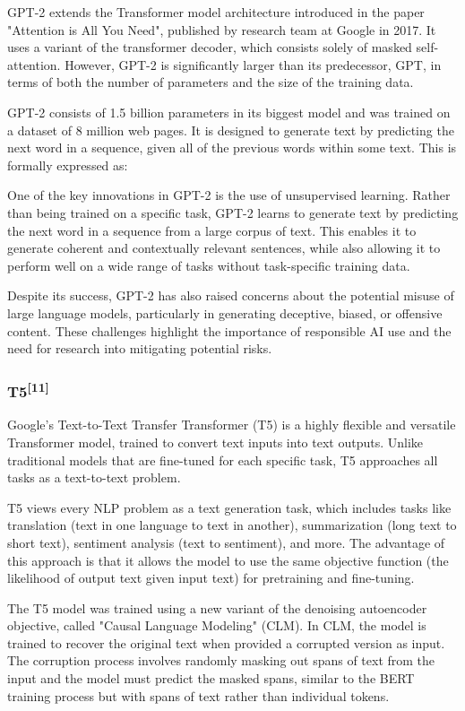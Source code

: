 \documentclass{article}
\begin{document}
GPT-2 extends the Transformer model architecture introduced in the paper "Attention is All You Need", published by research team at Google in 2017. It uses a variant of the transformer decoder, which consists solely of masked self-attention. However, GPT-2 is significantly larger than its predecessor, GPT, in terms of both the number of parameters and the size of the training data.

GPT-2 consists of 1.5 billion parameters in its biggest model and was trained on a dataset of 8 million web pages. It is designed to generate text by predicting the next word in a sequence, given all of the previous words within some text. This is formally expressed as:

One of the key innovations in GPT-2 is the use of unsupervised learning. Rather than being trained on a specific task, GPT-2 learns to generate text by predicting the next word in a sequence from a large corpus of text. This enables it to generate coherent and contextually relevant sentences, while also allowing it to perform well on a wide range of tasks without task-specific training data.

Despite its success, GPT-2 has also raised concerns about the potential misuse of large language models, particularly in generating deceptive, biased, or offensive content. These challenges highlight the importance of responsible AI use and the need for research into mitigating potential risks.

\subsubsection{T5\textsuperscript{[11]}}

Google's Text-to-Text Transfer Transformer (T5) is a highly flexible and versatile Transformer model, trained to convert text inputs into text outputs. Unlike traditional models that are fine-tuned for each specific task, T5 approaches all tasks as a text-to-text problem.

T5 views every NLP problem as a text generation task, which includes tasks like translation (text in one language to text in another), summarization (long text to short text), sentiment analysis (text to sentiment), and more. The advantage of this approach is that it allows the model to use the same objective function (the likelihood of output text given input text) for pretraining and fine-tuning.

The T5 model was trained using a new variant of the denoising autoencoder objective, called "Causal Language Modeling" (CLM). In CLM, the model is trained to recover the original text when provided a corrupted version as input. The corruption process involves randomly masking out spans of text from the input and the model must predict the masked spans, similar to the BERT training process but with spans of text rather than individual tokens.
\end{document}

